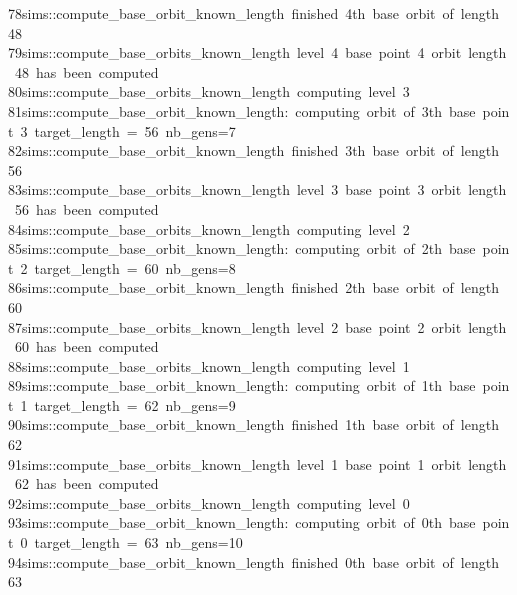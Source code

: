 \begin{tabbing}
78\>sims::compute\_base\_orbit\_known\_length\ finished\ 4th\ base\ orbit\ of\ length\ 48\\[0pt]
79\>sims::compute\_base\_orbits\_known\_length\ level\ 4\ base\ point\ 4\ orbit\ length\ 48\ has\ been\ computed\\[0pt]
80\>sims::compute\_base\_orbits\_known\_length\ computing\ level\ 3\\[0pt]
81\>sims::compute\_base\_orbit\_known\_length:\ computing\ orbit\ of\ 3th\ base\ point\ 3\ target\_length\ =\ 56\ nb\_gens=7\\[0pt]
82\>sims::compute\_base\_orbit\_known\_length\ finished\ 3th\ base\ orbit\ of\ length\ 56\\[0pt]
83\>sims::compute\_base\_orbits\_known\_length\ level\ 3\ base\ point\ 3\ orbit\ length\ 56\ has\ been\ computed\\[0pt]
84\>sims::compute\_base\_orbits\_known\_length\ computing\ level\ 2\\[0pt]
85\>sims::compute\_base\_orbit\_known\_length:\ computing\ orbit\ of\ 2th\ base\ point\ 2\ target\_length\ =\ 60\ nb\_gens=8\\[0pt]
86\>sims::compute\_base\_orbit\_known\_length\ finished\ 2th\ base\ orbit\ of\ length\ 60\\[0pt]
87\>sims::compute\_base\_orbits\_known\_length\ level\ 2\ base\ point\ 2\ orbit\ length\ 60\ has\ been\ computed\\[0pt]
88\>sims::compute\_base\_orbits\_known\_length\ computing\ level\ 1\\[0pt]
89\>sims::compute\_base\_orbit\_known\_length:\ computing\ orbit\ of\ 1th\ base\ point\ 1\ target\_length\ =\ 62\ nb\_gens=9\\[0pt]
90\>sims::compute\_base\_orbit\_known\_length\ finished\ 1th\ base\ orbit\ of\ length\ 62\\[0pt]
91\>sims::compute\_base\_orbits\_known\_length\ level\ 1\ base\ point\ 1\ orbit\ length\ 62\ has\ been\ computed\\[0pt]
92\>sims::compute\_base\_orbits\_known\_length\ computing\ level\ 0\\[0pt]
93\>sims::compute\_base\_orbit\_known\_length:\ computing\ orbit\ of\ 0th\ base\ point\ 0\ target\_length\ =\ 63\ nb\_gens=10\\[0pt]
94\>sims::compute\_base\_orbit\_known\_length\ finished\ 0th\ base\ orbit\ of\ length\ 63\\[0pt]

\end{tabbing}
